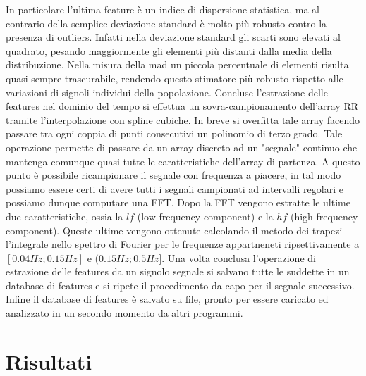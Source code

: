 \documentclass[12pt,a4paper, twoside, openright]{report}
\begin{document}
In particolare l'ultima feature è un indice di dispersione statistica, ma al contrario della semplice deviazione standard è molto più robusto contro la presenza di outliers.
Infatti nella deviazione standard gli scarti sono elevati al quadrato, pesando maggiormente gli elementi più distanti dalla media della distribuzione.
Nella misura della mad un piccola percentuale di elementi risulta quasi sempre trascurabile, rendendo questo stimatore più robusto rispetto alle variazioni di signoli individui della popolazione.
Concluse l'estrazione delle features nel dominio del tempo si effettua un sovra-campionamento dell'array RR tramite l'interpolazione con spline cubiche.
In breve si overfitta tale array facendo passare tra ogni coppia di punti consecutivi un polinomio di terzo grado.
Tale operazione permette di passare da un array discreto ad un "segnale" continuo che mantenga comunque quasi tutte le caratteristiche dell'array di partenza.
A questo punto è possibile ricampionare il segnale con frequenza a piacere, in tal modo possiamo essere certi di avere tutti i segnali campionati ad intervalli regolari e possiamo dunque computare una FFT.
Dopo la FFT vengono estratte le ultime due caratteristiche, ossia la $lf$ (low-frequency component) e la $hf$ (high-frequency component).
Queste ultime vengono ottenute calcolando il metodo dei trapezi l'integrale nello spettro di Fourier per le frequenze appartneneti ripsettivamente a $[0.04Hz;0.15Hz]$ e $(0.15Hz;0.5Hz]$.
Una volta conclusa l'operazione di estrazione delle features da un signolo segnale si salvano tutte le suddette in un database di features e si ripete il procedimento da capo per il segnale successivo.
Infine il database di features è salvato su file, pronto per essere caricato ed analizzato in un secondo momento da altri programmi.
%




\chapter{Risultati}



\section{}


\subsection{}
\end{document}

